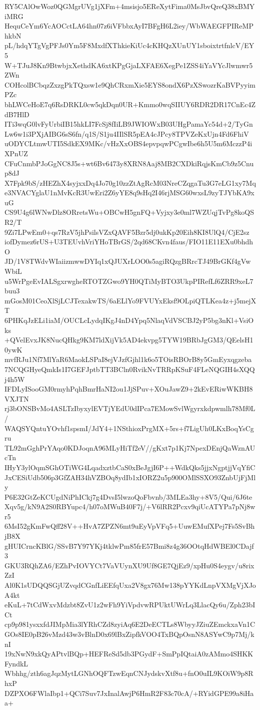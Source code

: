 RY5CAlOwWoz0QGMgrUVg1jXFm+4msisjo5EReXytFima0MsJbvQreQ38xBMYiMRG
HequCeYm6YcAOCctLA64hn07z6iVFbbxAyI7BFgH6L2iey/WbWAEGFPIReMPhkbN
pL/hdqYTgVgPFJs0Ym5F8MxdfXThkieKiUc4cKHQzXUnUY1sboixtrtfnlcV/EY5
W+TJuJ8Kn9BtwbjxXethdKA6xtKPgGjaLXFAE6XegPe1ZSS4iYaVYcJlwmwr5ZWn
COHcolBCbqzZxzgPkTQxsw1e9QhCRxmXie5EYS8ondX6PzXSwozrKaBVPyyimPZc
bhLWCeHoE7q6RsDRKL0cw5qkDqn0UR+Kmmo0wqSIIUY6RDR2DR17CnEc4ZdB7HlD
ITi3wqG0lvFyUrbiIB15hkLI7FcSj8fIiLB9JWIOWxB03UHgPamaYc54d+2/TyGn
Lw6w1i3PXjAIBG6sS6fn/q1S/S1ju4IIlSR5pEA4cJPcy8TPVZeKxUjn4Fd6FhiV
uODYCLtmwUTI5SdkEX9MKc/vHzXxOBS4epvpqwPCgwIbe6h5U5m6MczzP4iXPnUZ
CFuCnmbPJoGgNC8J5s+wt6Bv6473y8XRN8Aaj8MB2CXDkiRqjsKmCb9z5Cnup8dJ
X7Fpk9bS/zHEZhX4syjxxDq4Jo70g10zzZtAgRcM03NreCZqgaTu3G7eLG1xy7Mq
e3NVACYglaU1nMvKcR3UwEri2Z6yYE8q9sHq2I46rjMSG60wxsL9zyTJYbKA9xuG
CS9U4g6lWNwDlz8ORretsWu+OBCwH5gnFQ+Vyjxy3e0ml7WZUqjTvPg8koQSR2/T
9Zi7LPwEm0+qs7RzV5jhPsilsVZxQAVF5Bzr5dj0ukKp20Eih8KI8UlQ4/CjE2sz
iofDymez6rUS+U3TEUvhVriYHoTBrGS/2qd68CKvn4faus/FIO11E11EXu0bhdhO
JD/1V8TWdvWIaiizmwwDYIq1xQJUXrLOO0s5agiRQzgBRrcTJ49BrGKf4gVwWbiL
u5WrPgeEvIALSgxrwgheRTOTZGwo9YH0QTiMyBTO3UkpPIRefLf6ZRR9xeL7buu3
mGosM01CeoXlSjLCJTexakwTS/6aELlYo9FVUYxEksf9OLpiQTLKea4z+j5mejXT
6PHKqJzELi1iaM/OUCLcLydqIKgJ4nD4Ypq5NlaqVdVSCBJ2yP5bg3nKl+VsiOks
+QVelEvxJK8NucQHkg9KM7ldXijVk5AD4ekvpg5TYW19BRbJgGM3/QEelsH10ywK
mvfRJu1Nf7MlYaR6MaokLSPaI8ejVJzfGjhl1k6o5TOisRBOrB8y5GmEyxqgzeba
7NCQGHyeQmkIs1I7GEFJptbTT3BCln0RvikNvTRRpKSuF4FLeNQGIH4sXQQj4h5W
IFDLyISooGM0rmyhPqhBmrHaNI2ou1JjSPuv+XOuJawZ9+2kEvERiwWKBH8VXJTN
rj3bONSBvMo4ASLTzIbyxylEVTjYEdU0dIPca7EMowSvlWgyrxkdpwmlh78Mf0L/
WAQSYQntuYOvhf1spsmI/JdY4+1NSthioxPrgMX+5rs+f7LigUh0LKxBoqYsCgru
TL92mGghPrYAqo0KDJoqnA96MLyHiTf2eV//gKxt7p1Kj7NpexDEnjQaWznAUcTn
IHyY3ylOqmSGhOTiWG4LqadxztbCaS0xBeJgjI6P++WdkQks5jjxNgptjjVqYfiC
JxCESiUdb506p3GfZAH34hVZBOq8ydIb1xIORZ2u5p900OMlSSXO93ZnbUjFjMly
P6E32GtZeKCUgdNiPhICkj7g4DvsI5lwzoQoFbvnb/3MLEa3hy+8V5/Qui/6J6te
Xqv5g/kN9A2S0RBYupc4/h07oMWuB40F7j/+V6lRR2Pcxv9qiUcATYPa7pNj8wr5
6MsI52gKmFwQff28V++HvA7ZPZN6mt9uEyVpVFq5+UuwEMufXPej7Fs5SvBhjB8X
gHUICrncKBlG/SSvB7Y97YKj4tklwPm85frE57Bmi8z4g36OOtqHdWBEl0CDajf3
GKU3RQhZA6/EZhPvIOVYCt7VaVUynXU9Uf8GE7QjEz9/xpHu0S4eygv/u8rixZzI
Al0K1sUDQQSGjUZvqdCGnfLiEEfqUxa2V8gx76Mw138pYYKdLnpVXMgVjXJoA4kt
eKuL+7tCdWxvMdzbt8ZvU1z2wFh9YiVpdvwRPUktUWrLq3LlacQy6u/Zph23bICt
cp9p981ysxxfdJIMpMia3lYRhCZd8zyiAq6E2DeECTLs8WbyyJZiuZEmckxaVn1C
GOs8IE0pB26vMzd43w3vBlnD0x69lBxZipfkVOO4TxBQpOsnN8ASYwC9p7Mj/knI
19xNwN9xkQyAPtvlBQp+HEFReSd5db3PGydF+SmPpIQtaiA0zAMmo4SHKKFyndkL
Wbhhg/zth6agJqzMytLGNhOQFTzwEqnCNJydskvXtf8u+fnO0uIL9KOiW9p8RhxP
DZPXO6FWlaIbp1+QCi7Suv7JxInalAwjP6HmR2F83c70cA/+RYidGPE99a8iHaa+
